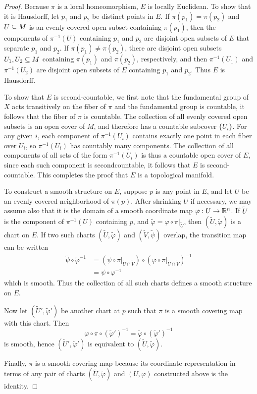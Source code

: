 \begin{proof}
Because $\pi$ is a local homeomorphism, $E$ is locally Euclidean. To show that it is Hausdorff, let $p_1$ and $p_2$ be distinct points in $E$. If $\pi(p_1)=\pi(p_2)$ and $U\subseteq M$ is an evenly covered open subset containing $\pi(p_1)$, then the components of $\pi^{-1}(U)$ containing $p_1$ and $p_2$ are disjoint open subsets of $E$ that separate $p_1$ and $p_2$. If $\pi(p_1)\neq\pi(p_2)$, there are disjoint open subsets $U_1,U_2\subseteq M$ containing $\pi(p_1)$ and $\pi(p_2)$, respectively, and then $\pi^{-1}(U_1)$ and $\pi^{-1}(U_2)$ are disjoint open subsets of $E$ containing $p_1$ and $p_2$. Thus $E$ is Hausdorff.\par
To show that $E$ is second-countable, we first note that the fundamental group of $X$ acts transitively on the fiber of $\pi$ and the fundamental group is countable, it follows that the fiber of $\pi$ is countable. The collection of all evenly covered open subsets is an open cover of $M$, and therefore has a countable subcover $\{U_i\}$. For any given $i$, each component of $\pi^{-1}(U_i)$ contains exactly one point in each fiber over $U_i$, so $\pi^{-1}(U_i)$ has countably many components. The collection of all components of all sets of the form $\pi^{-1}(U_i)$ is thus a countable open cover of $E$, since each such component is secondcountable, it follows that $E$ is second-countable. This completes the proof that $E$ is a topological manifold.\par
To construct a smooth structure on $E$, suppose $p$ is any point in $E$, and let $U$ be an evenly covered neighborhood of $\pi(p)$. After shrinking $U$ if necessary, we may assume also that it is the domain of a smooth coordinate map $\varphi:U\to\mathbb{R}^n$. If $\widetilde{U}$ is the component of $\pi^{-1}(U)$ containing $p$, and $\tilde{\varphi}=\varphi\circ\pi|_{\widetilde{U}}$, then $(\widetilde{U},\tilde{\varphi})$ is a chart on $E$. If two such charts $(\widetilde{U},\tilde{\varphi})$ and $(\widetilde{V},\tilde{\psi})$ overlap, the transition map can be written
\begin{align*}
\tilde{\psi}\circ\tilde{\varphi}^{-1}&=(\psi\circ\pi|_{\widetilde{U}\cap\widetilde{V}})\circ(\varphi\circ\pi|_{\widetilde{U}\cap\widetilde{V}})^{-1}\\
&=\psi\circ\varphi^{-1}
\end{align*}
which is smooth. Thus the collection of all such charts defines a smooth structure
on $E$.\par
Now let $(\widetilde{U}',\tilde{\varphi}')$ be another chart at $p$ such that $\pi$ is a smooth covering map with this chart. Then
\[\varphi\circ\pi\circ(\tilde{\varphi}')^{-1}=\tilde{\varphi}\circ(\tilde{\varphi}')^{-1}\]
is smooth, hence $(\widetilde{U}',\tilde{\varphi}')$ is equivalent to $(\widetilde{U},\tilde{\varphi})$.\par
Finally, $\pi$ is a smooth covering map because its coordinate representation in
terms of any pair of charts $(\widetilde{U},\tilde{\varphi})$ and $(U,\varphi)$ constructed above is the identity.
\end{proof}

